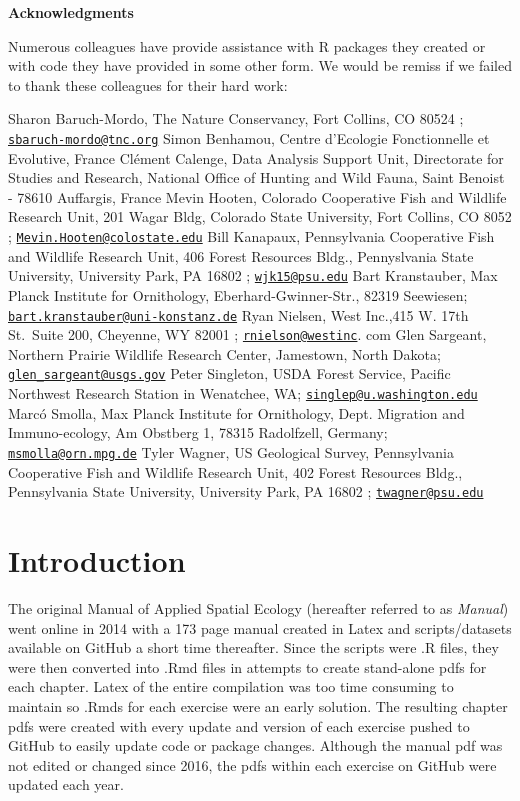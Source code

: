 \documentclass[
  letterpaper,
]{book}
\begin{document}
\textbf{Acknowledgments}

Numerous colleagues have provide assistance with R packages they created
or with code they have provided in some other form. We would be remiss
if we failed to thank these colleagues for their hard work:

Sharon Baruch-Mordo, The Nature Conservancy, Fort Collins, CO 80524 ;
\href{mailto:sbaruch-mordo@tnc.org}{\nolinkurl{sbaruch-mordo@tnc.org}}
Simon Benhamou, Centre d'Ecologie Fonctionnelle et Evolutive, France
Clément Calenge, Data Analysis Support Unit, Directorate for Studies and
Research, National Office of Hunting and Wild Fauna, Saint Benoist -
78610 Auffargis, France Mevin Hooten, Colorado Cooperative Fish and
Wildlife Research Unit, 201 Wagar Bldg, Colorado State University, Fort
Collins, CO 8052 ;
\href{mailto:Mevin.Hooten@colostate.edu}{\nolinkurl{Mevin.Hooten@colostate.edu}}
Bill Kanapaux, Pennsylvania Cooperative Fish and Wildlife Research Unit,
406 Forest Resources Bldg., Pennyslvania State University, University
Park, PA 16802 ; \href{mailto:wjk15@psu.edu}{\nolinkurl{wjk15@psu.edu}}
Bart Kranstauber, Max Planck Institute for Ornithology,
Eberhard-Gwinner-Str., 82319 Seewiesen;
\href{mailto:bart.kranstauber@uni-konstanz.de}{\nolinkurl{bart.kranstauber@uni-konstanz.de}}
Ryan Nielsen, West Inc.,415 W. 17th St.~Suite 200, Cheyenne, WY 82001 ;
\href{mailto:rnielson@westinc}{\nolinkurl{rnielson@westinc}}. com Glen
Sargeant, Northern Prairie Wildlife Research Center, Jamestown, North
Dakota;
\href{mailto:glen_sargeant@usgs.gov}{\nolinkurl{glen\_sargeant@usgs.gov}}
Peter Singleton, USDA Forest Service, Pacific Northwest Research Station
in Wenatchee, WA;
\href{mailto:singlep@u.washington.edu}{\nolinkurl{singlep@u.washington.edu}}
Marcó Smolla, Max Planck Institute for Ornithology, Dept. Migration and
Immuno-ecology, Am Obstberg 1, 78315 Radolfzell, Germany;
\href{mailto:msmolla@orn.mpg.de}{\nolinkurl{msmolla@orn.mpg.de}} Tyler
Wagner, US Geological Survey, Pennsylvania Cooperative Fish and Wildlife
Research Unit, 402 Forest Resources Bldg., Pennsylvania State
University, University Park, PA 16802 ;
\href{mailto:twagner@psu.edu}{\nolinkurl{twagner@psu.edu}}


\hypertarget{introduction}{%
\chapter{Introduction}\label{introduction}}

The original Manual of Applied Spatial Ecology (hereafter referred to as
\emph{Manual}) went online in 2014 with a 173 page manual created in
Latex and scripts/datasets available on GitHub a short time thereafter.
Since the scripts were .R files, they were then converted into .Rmd
files in attempts to create stand-alone pdfs for each chapter. Latex of
the entire compilation was too time consuming to maintain so .Rmds for
each exercise were an early solution. The resulting chapter pdfs were
created with every update and version of each exercise pushed to GitHub
to easily update code or package changes. Although the manual pdf was
not edited or changed since 2016, the pdfs within each exercise on
GitHub were updated each year.
\end{document}
